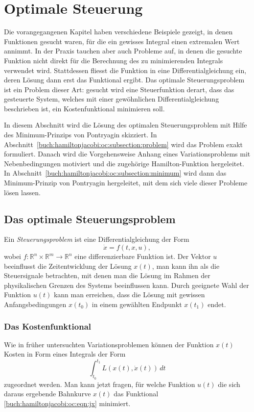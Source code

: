 %
%
%
\section{Optimale Steuerung
\label{buch:hamiltonjacobi:section:oc}}
Die vorangegangenen Kapitel haben verschiedene Beispiele gezeigt,
in denen Funktionen gesucht waren, für die ein gewisses Integral
einen extremalen Wert annimmt.
In der Praxis tauchen aber auch Probleme auf, in denen die
gesuchte Funktion nicht direkt für die Berechnung des zu minimierenden
Integrals verwendet wird.
Stattdessen fliesst die Funktion in eine Differentialgleichung
ein, deren Lösung dann erst das Funktional ergibt.
Das optimale Steuerungsproblem ist ein Problem dieser Art: gesucht
wird eine Steuerfunktion derart, dass das gesteuerte System, welches
mit einer gewöhnlichen Differentialgleichung beschrieben ist, ein
Kostenfunktional minimieren soll.

In diesem Abschnitt wird die Lösung des optimalen Steuerungsproblem
mit Hilfe des Minimum-Prinzips von Pontryagin skizziert.
In Abschnitt~\ref{buch:hamiltonjacobi:oc:subsection:problem}
wird das Problem exakt formuliert.
Danach wird die Vorgehensweise Anhang eines Variationsproblems
mit Nebenbedingungen motiviert und die zugehörige Hamilton-Funktion
hergeleitet.
In Abschnitt~\ref{buch:hamiltonjacobi:oc:subsection:minimum}
wird dann das Minimum-Prinzip von Pontryagin hergeleitet, mit dem
sich viele dieser Probleme lösen lassen.

%
%
\subsection{Das optimale Steuerungsproblem
\label{buch:hamiltonjacobi:oc:subsection:problem}}
Ein {\em Steuerungsproblem} ist eine Differentialgleichung der Form
\[
\dot{x}
=
f(t, x, u),
\]
wobei $f\colon\mathbb{R}^n\times\mathbb{R}^m\to\mathbb{R}^n$
eine differenzierbare Funktion ist.
Der Vektor $u$ beeinflusst die Zeitentwicklung der Lösung $x(t)$, man
kann ihn als die Steuersignale betrachten, mit denen man die Lösung
im Rahmen der physikalischen Grenzen des Systems beeinflussen kann.
Durch geeignete Wahl der Funktion $u(t)$ kann man erreichen, dass 
die Lösung mit gewissen Anfangsbedingungen $x(t_0)$ in einem
gewählten Endpunkt $x(t_1)$ endet.

%
%
\subsubsection{Das Kostenfunktional}
Wie in früher untersuchten Variationsproblemen können der Funktion $x(t)$
Kosten in Form eines Integrals der Form
\begin{equation}
\int_{t_0}^{t_1}
L(x(t), \dot{x}(t))
\,dt
\label{buch:hamiltonjacobi:oc:eqn:jxdotx}
\end{equation}
zugeordnet werden.
Man kann jetzt fragen, für welche Funktion $u(t)$ die sich daraus
ergebende Bahnkurve $x(t)$ das Funktional
\eqref{buch:hamiltonjacobi:oc:eqn:jx}
minimiert.

